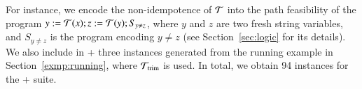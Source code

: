 %
For instance, we encode the non-idempotence of $\mathcal{T}$ into the path feasibility of the {\slint} program $y:=\mathcal{T}(x); z:=\mathcal{T}(y); S_{y \neq z}$, where $y$ and $z$ are two fresh string variables, and $S_{y \neq z}$ is the {\slint} program encoding $y \neq z$ (see Section~\ref{sec:logic} for its details). We also include in {\transducerbench+} three instances generated from the running example in Section~\ref{exmp:running}, 
where $\mathcal{T}_{\rm trim}$ is used. 
In total, we obtain 94 instances for the {\transducerbench+} suite. 
%
%
%
%


